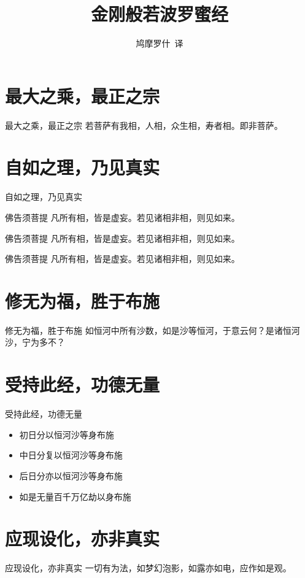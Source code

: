 \documentclass{beamer}
\begin{document}
\begin{frame}
\title{金刚般若波罗蜜经}
\author{鸠摩罗什\ 译}
\date{}
\maketitle
\end{frame}

\frame{\tableofcontents}

\section{最大之乘，最正之宗}
\begin{frame}{最大之乘，最正之宗}
若菩萨有我相，人相，众生相，寿者相。即非菩萨。
\end{frame}

\section{自如之理，乃见真实}
\begin{frame}{自如之理，乃见真实}
\begin{block}{佛告须菩提}
凡所有相，皆是虚妄。若见诸相非相，则见如来。
\end{block}
\begin{alertblock}{佛告须菩提}
凡所有相，皆是虚妄。若见诸相非相，则见如来。
\end{alertblock}
\begin{exampleblock}{佛告须菩提}
凡所有相，皆是虚妄。若见诸相非相，则见如来。
\end{exampleblock}
\end{frame}

\section{修无为福，胜于布施}
\frame{\tableofcontents[currentsection]}
\begin{frame}{修无为福，胜于布施}
如恒河中所有沙数，如是沙等恒河，于意云何？是诸恒河沙，宁为多不？
\end{frame}

\section{受持此经，功德无量}
\begin{frame}{受持此经，功德无量}
\begin{itemize}
    \item 初日分以恒河沙等身布施
    \pause
    \item 中日分复以恒河沙等身布施
    \pause
    \item 后日分亦以恒河沙等身布施
    \pause
    \item 如是无量百千万亿劫以身布施
\end{itemize}
\end{frame}

\section{应现设化，亦非真实}
\begin{frame}{应现设化，亦非真实}
\transdissolve
一切有为法，如梦幻泡影，如露亦如电，应作如是观。
\end{frame}
\end{document}
